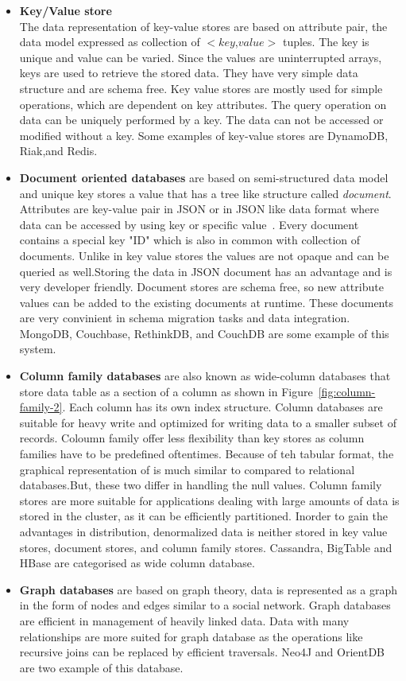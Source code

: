 	\begin{itemize}
		\item 
			\textbf{Key/Value store}\\ The data representation of key-value stores are based on attribute pair, the data model expressed as collection of $<$$key$,$value$$>$ tuples. The key is unique and value can be varied. Since the values are uninterrupted arrays, keys are used to retrieve the stored data. They have very simple data structure and are schema free. Key value stores are mostly used for simple operations, which are dependent on key attributes. The query operation on data can be uniquely performed by a key. The data can not be accessed or modified without a key. Some examples of key-value stores are DynamoDB, Riak,and Redis.
		\item 
			\textbf{Document oriented databases} are based on semi-structured data model and unique key stores a value that has a tree like structure called \textit{document}. Attributes are key-value pair in JSON or in JSON like data format where data can be accessed by using key or specific value~\citep{hecht2011nosql}. Every document contains a special key "ID" which is also in common with collection of documents. Unlike in key value stores the values are not opaque and can be queried as well.Storing the data in JSON document has an advantage and is very developer friendly. Document stores are schema free, so new attribute values can be added to the existing documents at runtime. These documents are very convinient in schema migration tasks and data integration.  MongoDB, Couchbase, RethinkDB, and CouchDB are some example of this system.
		\item 
			\textbf{Column family databases} are also known as wide-column databases that store data table as a section of a column as shown in Figure~\ref{fig:column-family-2}. Each column has its own index structure.
			 Column databases are suitable for heavy write and optimized for writing data to a smaller subset of records. Coloumn family offer less flexibility than key stores as column families have to be predefined oftentimes. Because of teh tabular format, the graphical representation of is much similar to compared to relational databases.But, these two differ in handling the null values. Column family stores are more suitable for applications dealing with large amounts of data is stored in the cluster, as it can be efficiently partitioned. Inorder to gain the advantages in distribution, denormalized data is neither stored in key value stores, document stores, and column family stores.  Cassandra, BigTable and HBase are categorised as wide column database.
		\item 
			\textbf{Graph databases} are based on graph theory, data  is represented as a graph in the form of nodes and edges similar to a social network. Graph databases are efficient in management of heavily linked data. Data with many relationships are more suited for graph database as the operations like recursive joins can be replaced by efficient traversals. Neo4J and OrientDB are two example of this database.
	\end{itemize}
